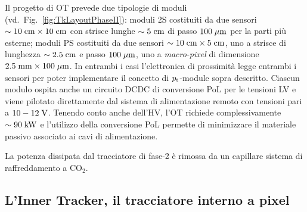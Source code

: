 Il progetto di OT prevede due tipologie di moduli (vd.~Fig.~\ref{fig:TkLayoutPhaseII}): moduli 2S costituiti da due sensori $\sim10\rm \; cm\times10\rm \; cm$ con strisce lunghe $\sim5\rm \; cm$ di passo $100\; \mu \rm m$ per la parti pi\`u esterne; moduli PS costituiti da due sensori $\sim10\rm \; cm\times5\rm \; cm$, uno a strisce di lunghezza $\sim2.5\rm \; cm$ e passo $100\; \mu \rm m$, uno a {\em macro-pixel} di dimensione $2.5\rm \; mm\times100\; \mu \rm m$. In entrambi i casi l'elettronica di prossimit\`a legge entrambi i sensori per poter implementare il concetto di ${p_{\rm t}}$-module sopra descritto. Ciascun modulo ospita anche un circuito DCDC di conversione PoL per le tensioni LV e viene pilotato direttamente dal sistema di alimentazione remoto con tensioni pari a $10-12\rm \; V$. Tenendo conto anche dell'HV, l'OT richiede complessivamente $\sim90\rm \; kW$ e l'utilizzo della conversione PoL permette di minimizzare il materiale passivo associato ai cavi di alimentazione.

La potenza dissipata dal tracciatore di fase-2 \`e rimossa da un capillare sistema di raffreddamento a CO$_2$.



%
%


\subsection{L'Inner Tracker, il tracciatore interno a pixel}

